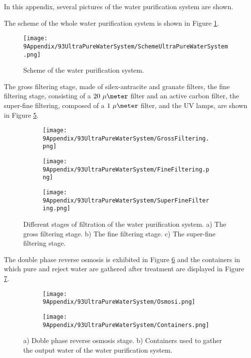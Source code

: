 In this appendix, several pictures of the water purification system are shown. 

The scheme of the whole water purification system is shown in Figure \ref{fig:SchemeUPWS}.

\begin{figure}[htbp]
\centering
\texttt{[image: 9Appendix/93UltraPureWaterSystem/SchemeUltraPureWaterSystem.png]}
\caption{Scheme of the water purification system.\label{fig:SchemeUPWS}}
\end{figure}

The gross filtering stage, made of silex-antracite and granate filters, the fine filtering stage, consisting of a $20~\mu\meter$ filter and an active carbon filter, the super-fine filtering, composed of a $1~\mu\meter$ filter, and the UV lamps, are shown in Figure \ref{fig:UltraPureWaterStages}.

\begin{figure}
\centering
    \begin{subfigure}[b]{0.3\textwidth}
    \centering
    \texttt{[image: 9Appendix/93UltraPureWaterSystem/GrossFiltering.png]}  
    \caption{\label{subfig:GrossFiltering}}
    \end{subfigure}
    \hfill
    \begin{subfigure}[b]{0.3\textwidth}
    \centering
    \texttt{[image: 9Appendix/93UltraPureWaterSystem/FineFiltering.png]}  
    \caption{\label{subfig:FineFiltering}}
    \end{subfigure}
    \hfill
    \begin{subfigure}[b]{0.3\textwidth}
    \centering
    \texttt{[image: 9Appendix/93UltraPureWaterSystem/SuperFineFiltering.png]}  
    \caption{\label{subfig:SuperFineFiltering}}
    \end{subfigure}
 \caption{Different stages of filtration of the water purification system. a) The gross filtering stage. b) The fine filtering stage. c) The super-fine filtering stage.}
 \label{fig:UltraPureWaterStages}
\end{figure}

The double phase reverse osmosis is exhibited in Figure \ref{subfig:Osmosi} and the containers in which pure and reject water are gathered after treatment are displayed in Figure \ref{subfig:Containers}.

\begin{figure}
\centering
    \begin{subfigure}[b]{0.3\textwidth}
    \centering
    \texttt{[image: 9Appendix/93UltraPureWaterSystem/Osmosi.png]}  
    \caption{\label{subfig:Osmosi}}
    \end{subfigure}
    \hfill
    \begin{subfigure}[b]{0.5\textwidth}
    \centering
    \texttt{[image: 9Appendix/93UltraPureWaterSystem/Containers.png]}  
    \caption{\label{subfig:Containers}}
    \end{subfigure}
 \caption{a) Doble phase reverse osmosis stage. b) Containers used to gather the output water of the water purification system.}
 \label{subfig:OsmosisContainers}
\end{figure}

